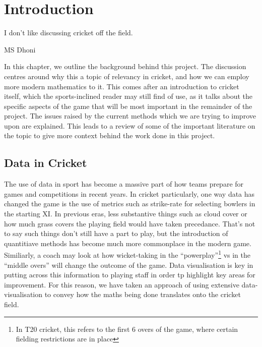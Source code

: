 \chapter{Introduction}

\epigraph{I don't like discussing cricket off the field.}{MS Dhoni}

In this chapter, we outline the background behind this project. The discussion centres around why this a topic of relevancy in cricket, and how we can employ more modern mathematics to it. This comes after an introduction to cricket itself,
which the sports-inclined reader may still find of use, as it talks about the specific aspects of the game that will be most important in the remainder of the project. The issues raised by the current methods 
which we are trying to improve upon are explained. This leads to a review of some of the important literature on the topic to give more context behind the work done in this project.

\section{Data in Cricket}
The use of data in sport has become a massive part of how teams prepare for games and competitions in recent years. In cricket particularly, one way data has changed the game is the use
of metrics such as strike-rate for selecting bowlers in the starting XI. In previous eras, less substantive things such as cloud cover or how much grass covers the playing field would have taken precedance.
That's not to say such things don't still have a part to play, but the introduction of quantitiave methods has become much more commonplace in the modern game.
Similiarly, a coach may look at how wicket-taking in the ``powerplay''\footnote{In T20 cricket, this refers to the first 6 overs of the game, where certain fielding restrictions are in place}
vs in the ``middle overs'' will change the outcome of the game. Data visualisation is key in putting across this information to playing staff in order tp highlight key areas for
improvement. For this reason, we have taken an approach of using extensive data-visualisation to convey how the maths being done translates onto the cricket field. \\ 

